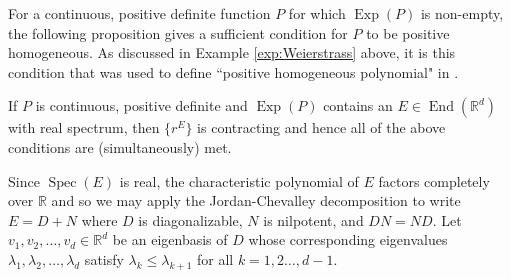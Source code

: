 \documentclass[smallextended]{svjour3}
\theoremstyle{remark}
\renewenvironment{proof}[1][\proofname]{\renewcommand\xproofname{#1}\xproof}{\endxproof}
\newcommand\End{\operatorname{End}} %
\newcommand\Exp{\operatorname{Exp}}
\newcommand\Spec{\operatorname{Spec}}
\newcommand\R{\mathbb{R}}
\begin{document}
\noindent For a continuous, positive definite function $P$ for which $\Exp(P)$ is non-empty, the following proposition gives a sufficient condition for $P$ to be positive homogeneous. As discussed in Example \ref{exp:Weierstrass} above, it is this condition that was used to define ``positive homogeneous polynomial" in \cite{randles_convolution_2017}. 


\begin{proposition}\label{prop:PosHomSufficientCondition}
If $P$ is continuous, positive definite and $\Exp(P)$ contains an $E\in\End(\mathbb{R}^d)$ with real spectrum, then $\{r^E\}$ is contracting and hence all of the above conditions are (simultaneously) met. 
\end{proposition}
\begin{proof}
Since $\Spec(E)$ is real, the characteristic polynomial of $E$ factors completely over $\R$ and so we may apply the Jordan-Chevalley decomposition to write $E=D+N$ where $D$ is diagonalizable, $N$ is nilpotent, and $DN=ND$. Let $v_1,v_2,\dots,v_d \in \R^d$ be an eigenbasis of $D$ whose corresponding eigenvalues $\lambda_1,\lambda_2,\dots,\lambda_d$ satisfy $\lambda_k\leq \lambda_{k+1}$ for all $k=1,2\dots,d-1$.


\end{proof}
\end{document}
